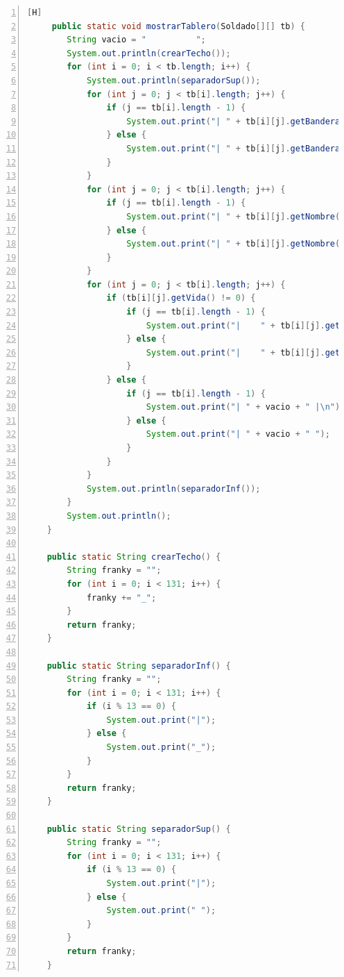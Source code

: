 \documentclass{article}
\begin{document}
	\begin{lstlisting}[language=java,caption={Mostrar el tablero}, numbers=left][H]
	 public static void mostrarTablero(Soldado[][] tb) {
        String vacio = "          ";
        System.out.println(crearTecho());
        for (int i = 0; i < tb.length; i++) {
            System.out.println(separadorSup());
            for (int j = 0; j < tb[i].length; j++) {
                if (j == tb[i].length - 1) {
                    System.out.print("| " + tb[i][j].getBandera() + " |\n");
                } else {
                    System.out.print("| " + tb[i][j].getBandera() + " ");
                }
            }
            for (int j = 0; j < tb[i].length; j++) {
                if (j == tb[i].length - 1) {
                    System.out.print("| " + tb[i][j].getNombre() + " |\n");
                } else {
                    System.out.print("| " + tb[i][j].getNombre() + " ");
                }
            }
            for (int j = 0; j < tb[i].length; j++) {
                if (tb[i][j].getVida() != 0) {
                    if (j == tb[i].length - 1) {
                        System.out.print("|    " + tb[i][j].getVida() + " HP" + "    |\n");
                    } else {
                        System.out.print("|    " + tb[i][j].getVida() + " HP" + "    ");
                    }
                } else {
                    if (j == tb[i].length - 1) {
                        System.out.print("| " + vacio + " |\n");
                    } else {
                        System.out.print("| " + vacio + " ");
                    }
                }
            }
            System.out.println(separadorInf());
        }
        System.out.println();
    }

    public static String crearTecho() {
        String franky = "";
        for (int i = 0; i < 131; i++) {
            franky += "_";
        }
        return franky;
    }

    public static String separadorInf() {
        String franky = "";
        for (int i = 0; i < 131; i++) {
            if (i % 13 == 0) {
                System.out.print("|");
            } else {
                System.out.print("_");
            }
        }
        return franky;
    }

    public static String separadorSup() {
        String franky = "";
        for (int i = 0; i < 131; i++) {
            if (i % 13 == 0) {
                System.out.print("|");
            } else {
                System.out.print(" ");
            }
        }
        return franky;
    }
	\end{lstlisting}
	
\end{document}
